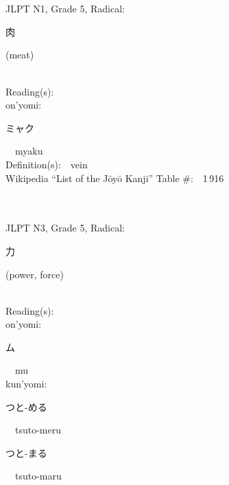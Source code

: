\begin{multicols}{2}
\ \ \\
{\fontsize{34pt}{40pt}  }\ \ \\  %
{JLPT N1, Grade 5, Radical:\ \ {\begin{CJK}{UTF8}{min} 肉 \end{CJK}} (meat) } \\
Reading(s):\ \ \\
{\hspace*{1em}}on'yomi:\ \ \\
{\hspace*{2em}}{\begin{CJK}{UTF8}{min} ミャク \end{CJK}}\ \ myaku\ \ \\
Definition(s):\ \ vein \\
Wikipedia ``List of the J\=oy\=o Kanji'' Table \#:\ \ 1\,916 \\
\ \ \\
{\fontsize{34pt}{40pt}  }\ \ \\  %
{JLPT N3, Grade 5, Radical:\ \ {\begin{CJK}{UTF8}{min} 力 \end{CJK}} (power, force) } \\
Reading(s):\ \ \\
{\hspace*{1em}}on'yomi:\ \ \\
{\hspace*{2em}}{\begin{CJK}{UTF8}{min} ム \end{CJK}}\ \ mu\ \ \\
{\hspace*{1em}}kun'yomi:\ \ \\
{\hspace*{2em}}{\begin{CJK}{UTF8}{min} つと-める \end{CJK}}\ \ tsuto-meru\ \ \\
{\hspace*{2em}}{\begin{CJK}{UTF8}{min} つと-まる \end{CJK}}\ \ tsuto-maru\ \ \\

\end{multicols}
